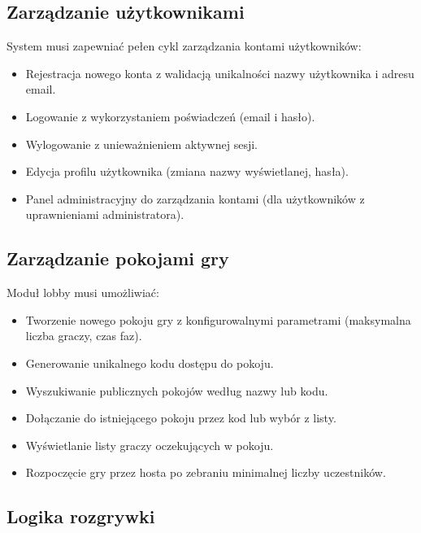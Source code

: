 ﻿\documentclass[a4paper,twoside,11pt]{mwrep}
\theoremstyle{plain} \newtheorem{thm}{Twierdzenie}
\theoremstyle{plain} \newtheorem{lem}{Lemat}
\theoremstyle{definition} \newtheorem{defn}{Definicja}
\theoremstyle{remark} \newtheorem*{rem}{Wniosek}
\begin{document}
\subsection{Zarządzanie użytkownikami}

System musi zapewniać pełen cykl zarządzania kontami użytkowników:
\begin{itemize}
    \item Rejestracja nowego konta z walidacją unikalności nazwy użytkownika i adresu email.
    \item Logowanie z wykorzystaniem poświadczeń (email i hasło).
    \item Wylogowanie z unieważnieniem aktywnej sesji.
    \item Edycja profilu użytkownika (zmiana nazwy wyświetlanej, hasła).
    \item Panel administracyjny do zarządzania kontami (dla użytkowników z uprawnieniami administratora).
\end{itemize}

\subsection{Zarządzanie pokojami gry}

Moduł lobby musi umożliwiać:
\begin{itemize}
    \item Tworzenie nowego pokoju gry z konfigurowalnymi parametrami (maksymalna liczba graczy, czas faz).
    \item Generowanie unikalnego kodu dostępu do pokoju.
    \item Wyszukiwanie publicznych pokojów według nazwy lub kodu.
    \item Dołączanie do istniejącego pokoju przez kod lub wybór z listy.
    \item Wyświetlanie listy graczy oczekujących w pokoju.
    \item Rozpoczęcie gry przez hosta po zebraniu minimalnej liczby uczestników.
\end{itemize}

\subsection{Logika rozgrywki}
\end{document}

